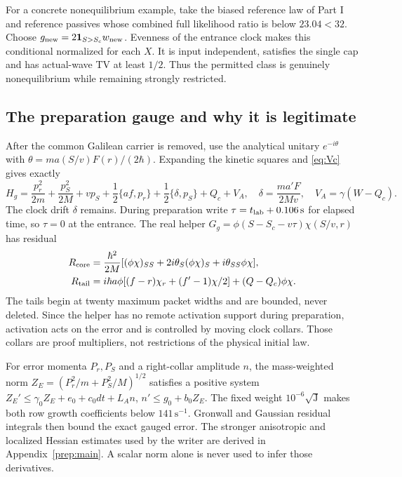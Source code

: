 \documentclass[11pt]{article}
\theoremstyle{definition}\newtheorem{definition}[theorem]{Definition}
\theoremstyle{remark}\newtheorem{remark}[theorem]{Remark}
\newcommand{\one}{\mathbf1}\newcommand{\R}{\mathbb R}\newcommand{\T}{\mathbb T}
\begin{document}
For a concrete nonequilibrium example, take the biased reference law of
Part I and reference passives whose combined full likelihood ratio is
below $23.04<32$. Choose $g_{\rm new}=2\one_{S>S_c}w_{\rm new}$.
Evenness of the entrance clock makes this conditional normalized for
each $X$. It is input independent, satisfies the single cap and has
actual-wave TV at least $1/2$. Thus the permitted class is genuinely
nonequilibrium while remaining strongly restricted.

\subsection{The preparation gauge and why it is legitimate}
After the common Galilean carrier is removed, use the analytical unitary
$e^{-i\theta}$ with $\theta=ma(S/v)F(r)/(2\hbar)$. Expanding the
kinetic squares and \eqref{eq:Vc} gives exactly
\[
 H_g=\frac{p_r^2}{2m}+\frac{p_S^2}{2M}+vp_S
   +\frac12\{af,p_r\}+\frac12\{\delta,p_S\}+Q_c+V_A,
 \quad \delta=\frac{ma'F}{2Mv},\quad V_A=\gamma(W-Q_c).
\]
The clock drift $\delta$ remains. During preparation write $\tau=t_{\rm lab}+0.106\,\mathrm s$
for elapsed time, so $\tau=0$ at the entrance. The real helper
$G_g=\phi(S-S_c-v\tau)\chi(S/v,r)$ has residual
\begin{align*}
 R_{\rm core}&=\frac{\hbar^2}{2M}
 [(\phi\chi)_{SS}+2i\theta_S(\phi\chi)_S+i\theta_{SS}\phi\chi],\\
 R_{\rm tail}&=i\hbar a\phi[(f-r)\chi_r+(f'-1)\chi/2]
                       +(Q-Q_c)\phi\chi.
\end{align*}
The tails begin at twenty maximum packet widths and are bounded, never
deleted. Since the helper has no remote activation support during
preparation, activation acts on the error and is controlled by moving
clock collars. Those collars are proof multipliers, not restrictions of
the physical initial law.

For error momenta $P_r,P_S$ and a right-collar amplitude $n$, the
mass-weighted norm $Z_E=(P_r^2/m+P_S^2/M)^{1/2}$ satisfies a positive
system $Z_E'\le\gamma_0Z_E+e_0+c_0dt+L_A n$,
$n'\le g_0+b_0Z_E$. The fixed weight
$10^{-6}\sqrt{\mathrm J}$ makes both row growth coefficients below
$141\,\mathrm s^{-1}$. Gronwall and Gaussian residual integrals then
bound the exact gauged error. The stronger anisotropic and localized
Hessian estimates used by the writer are derived in Appendix~\ref{prep:main}. A scalar norm alone is never used to
infer those derivatives.

\end{document}
